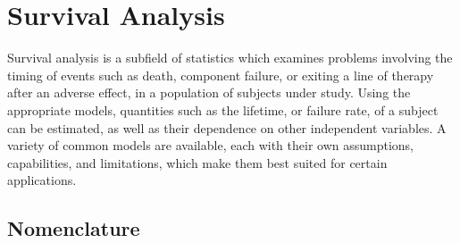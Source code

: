 \chapter{Survival Analysis}
\label{chap:survival}

Survival analysis is a subfield of statistics which examines problems involving the timing of events
such as death, component failure, or exiting a line of therapy after an adverse effect, in a population of subjects under study.
Using the appropriate models, quantities such as the lifetime, or failure rate, of a subject
can be estimated, as well as their dependence on other independent variables.
A variety of common models are available,
each with their own assumptions, capabilities, and limitations,
which make them best suited for certain applications.

\section{Nomenclature}
\label{survival:nomenclature}

